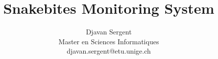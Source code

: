 \documentclass[10pt, conference, compsocconf]{llncs}
\begin{document}
%
\title{Snakebites Monitoring System}





% 
\author{Djavan Sergent \\
Master en Sciences Informatiques \\
 djavan.sergent@etu.unige.ch}




\maketitle
\end{document}

